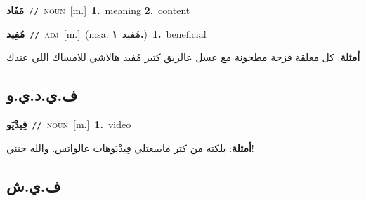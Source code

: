 \documentclass[10pt,a4paper,twoside]{article} %
\begin{document}
\begin{multicols}{2}
{\setlength\topsep{0pt}\textbf{\foreignlanguage{arabic}{مَفَاد}}\ {\color{gray}\texttt{//}\color{black}}\ \textsc{noun}\ [m.]\ \textbf{1.}~meaning  \textbf{2.}~content\ } \vspace{2mm}

{\setlength\topsep{0pt}\textbf{\foreignlanguage{arabic}{مُفِيد}}\ {\color{gray}\texttt{//}\color{black}}\ \textsc{adj}\ [m.]\ \color{gray}(msa. \foreignlanguage{arabic}{مُفيد}~\foreignlanguage{arabic}{\textbf{١.}})\color{black}\ \textbf{1.}~beneficial\  \begin{flushright}\color{gray}\foreignlanguage{arabic}{\textbf{\underline{\foreignlanguage{arabic}{أمثلة}}}: كل معلقة قزحة مطحونة مع عسل عالريق كثير مُفيد هالاشي للامساك اللي عندك}\end{flushright}\color{black}} \vspace{2mm}

\vspace{-3mm}
\subsection*{\color{blue}\foreignlanguage{arabic}{ف.ي.د.ي.و}\color{blue}{ (ntws)}} 

{\setlength\topsep{0pt}\textbf{\foreignlanguage{arabic}{فِيدْيَو}}\ {\color{gray}\texttt{//}\color{black}}\ \textsc{noun}\ [m.]\ \textbf{1.}~video\  \begin{flushright}\color{gray}\foreignlanguage{arabic}{\textbf{\underline{\foreignlanguage{arabic}{أمثلة}}}: بلكته من كثر مابيبعثلي فِيدْيَوهات عالواتس. والله جنني!}\end{flushright}\color{black}} \vspace{2mm}

\vspace{-3mm}
\subsection*{\color{blue}\foreignlanguage{arabic}{ف.ي.ش}\color{blue}{}} 


\end{multicols}
\end{document}
